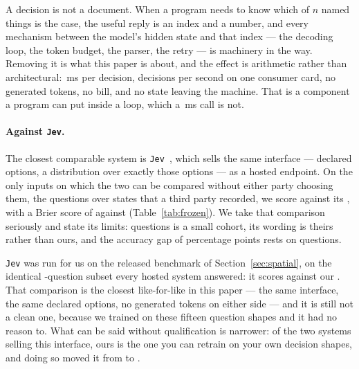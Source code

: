 \documentclass[11pt]{article}
\newcommand{\1}{\mathbf{1}}
\begin{document}
A decision is not a document. When a program needs to know which of $n$ named things is the case,
the useful reply is an index and a number, and every mechanism between the model's hidden state and
that index --- the decoding loop, the token budget, the parser, the retry --- is machinery in the
way. Removing it is what this paper is about, and the effect is arithmetic rather than
architectural: \oursMsPerDecision{}\,ms per decision, \oursPerSecond{} decisions per second on one
consumer card, no generated tokens, no bill, and no state leaving the machine. That is a component
a program can put inside a loop, which a \apiclaudeopusfiveMs{}\,ms call is not.

\paragraph{Against \texttt{Jev}.} The closest comparable system is
\texttt{Jev}~\cite{almeida2026systemone}, which sells the same interface --- declared options, a distribution
over exactly those options --- as a hosted endpoint. On the only inputs on which the two can be
compared without either party choosing them, the \frozenN{} questions over \frozenStates{} states
that a third party recorded, we score \frozenOursAcc{} against its \jevAcc{}, with a Brier score of
\frozenOursBrier{} against \jevBrier{} (Table~\ref{tab:frozen}). We take that comparison seriously
and state its limits: \frozenN{} questions is a small cohort, its wording is theirs rather than
ours, and the accuracy gap of \frozenGapPP{} percentage points rests on \frozenGapN{} questions.

\texttt{Jev} was run for us on the released benchmark of Section~\ref{sec:spatial}, on the
identical \spatialN{}-question subset every hosted system answered: it scores \jevBenchAcc{}
against our \spatialOursSubset{}. That comparison is the closest like-for-like in this paper ---
the same interface, the same declared options, no generated tokens on either side --- and it is
still not a clean one, because we trained on these fifteen question shapes and it had no reason
to. What can be said without qualification is narrower: of the two systems selling this interface,
ours is the one you can retrain on your own decision shapes, and doing so moved it from
\spatialOursBefore{} to \spatialOursSubset{}.
\end{document}
